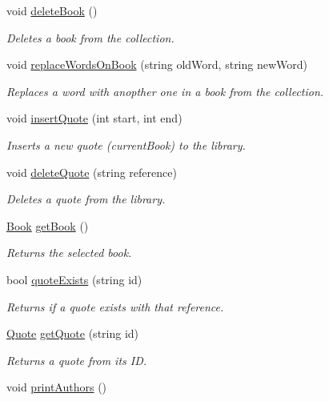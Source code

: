 \begin{DoxyCompactItemize}
void \hyperlink{class_library_a0248e22f1ba1611d3b3c8b7843a6d8b9}{delete\+Book} ()
\begin{DoxyCompactList}\small\item\em Deletes a book from the collection. \end{DoxyCompactList}\item 
void \hyperlink{class_library_abf34dcdd5eb2a7c4127e8a50db814750}{replace\+Words\+On\+Book} (string old\+Word, string new\+Word)
\begin{DoxyCompactList}\small\item\em Replaces a word with anopther one in a book from the collection. \end{DoxyCompactList}\item 
void \hyperlink{class_library_aac2d7d4645a2adda29a0064bc66e6143}{insert\+Quote} (int start, int end)
\begin{DoxyCompactList}\small\item\em Inserts a new quote (current\+Book) to the library. \end{DoxyCompactList}\item 
void \hyperlink{class_library_a8f11e390553184c2a3a549697df3f3a9}{delete\+Quote} (string reference)
\begin{DoxyCompactList}\small\item\em Deletes a quote from the library. \end{DoxyCompactList}\item 
\hyperlink{class_book}{Book} \hyperlink{class_library_a67ccad51c76c3abfb0d46fa533f46e03}{get\+Book} ()
\begin{DoxyCompactList}\small\item\em Returns the selected book. \end{DoxyCompactList}\item 
bool \hyperlink{class_library_a4d87e1bd531b56f79d1faa8781f34630}{quote\+Exists} (string id)
\begin{DoxyCompactList}\small\item\em Returns if a quote exists with that reference. \end{DoxyCompactList}\item 
\hyperlink{class_quote}{Quote} \hyperlink{class_library_aba57d7dcf92c9da4c3d8a359ceba7e2b}{get\+Quote} (string id)
\begin{DoxyCompactList}\small\item\em Returns a quote from its ID. \end{DoxyCompactList}\item 
void \hyperlink{class_library_aba2ed0b3b1ee81565ca5b62f2ac5c924}{print\+Authors} ()

\end{DoxyCompactItemize}
